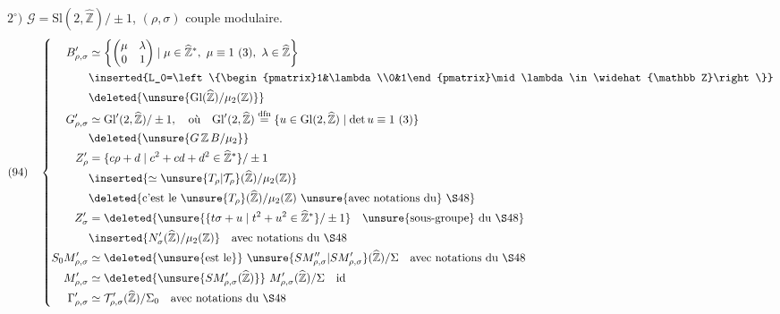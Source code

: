 $2^\circ)$ $\mathcal G=\mathrm{Sl}(2,\widehat{\mathbb Z})/\pm1$, $(\rho,\sigma)$ couple modulaire.
\[
\begin{aligned}
(94)\quad\left\{\begin{aligned}
B'_{\rho,\sigma}&\simeq
\left\{\begin{pmatrix}\mu&\lambda\\0&1\end{pmatrix}
\mid\mu\in\widehat{\mathbb Z}^{*},\ \mu\equiv1\ (3),\ \lambda\in\widehat{\mathbb Z}\right\}\\
&\inserted{L_0=\left\{\begin{pmatrix}1&\lambda\\0&1\end{pmatrix}\mid\lambda\in\widehat{\mathbb Z}\right\}}\\
&\deleted{\unsure{\mathrm{Gl}(\widehat{\mathbb Z})/\mu_2(\mathbb Z)}}\\
G'_{\rho,\sigma}&\simeq\mathrm{Gl}'(2,\widehat{\mathbb Z})/\pm1,\quad\text{où}\quad
\mathrm{Gl}'(2,\widehat{\mathbb Z})\overset{\mathrm{dfn}}=
\{u\in\mathrm{Gl}(2,\widehat{\mathbb Z})\mid\det u\equiv1\ (3)\}\\
&\deleted{\unsure{G\,\mathbb Z\,B/\mu_2}}\\
Z'_{\rho}&=\{c\rho+d\mid c^2+cd+d^2\in\widehat{\mathbb Z}^{*}\}/\pm1\\
&\inserted{\simeq\unsure{T_\rho|\mathcal T_\rho}(\widehat{\mathbb Z})/\mu_2(\mathbb Z)}\\
&\deleted{\text{c'est le}\ \unsure{T_\rho}(\widehat{\mathbb Z})/\mu_2(\mathbb Z)\ \text{\unsure{avec notations du} \S48}}\\
Z'_{\sigma}&=\deleted{\unsure{\{t\sigma+u\mid t^2+u^2\in\widehat{\mathbb Z}^{*}\}/\pm1}\quad\text{\unsure{sous-groupe} du \S48}}\\
&\inserted{N'_{\sigma}(\widehat{\mathbb Z})/\mu_2(\mathbb Z)}\quad\text{avec notations du \S48}\\
S_0M'_{\rho,\sigma}&\simeq\deleted{\text{\unsure{est le}}}\
\unsure{SM''_{\rho,\sigma}|SM'_{\rho,\sigma}}(\widehat{\mathbb Z})/\Sigma\quad\text{avec notations du \S48}\\
M'_{\rho,\sigma}&\simeq\deleted{\unsure{SM'_{\rho,\sigma}(\widehat{\mathbb Z})}}\
M'_{\rho,\sigma}(\widehat{\mathbb Z})/\Sigma\quad\text{id}\\
\Gamma'_{\rho,\sigma}&\simeq\mathcal T'_{\rho,\sigma}(\widehat{\mathbb Z})/\Sigma_0\quad\text{avec notations du \S48}
\end{aligned}\right.
\end{aligned}
\]


